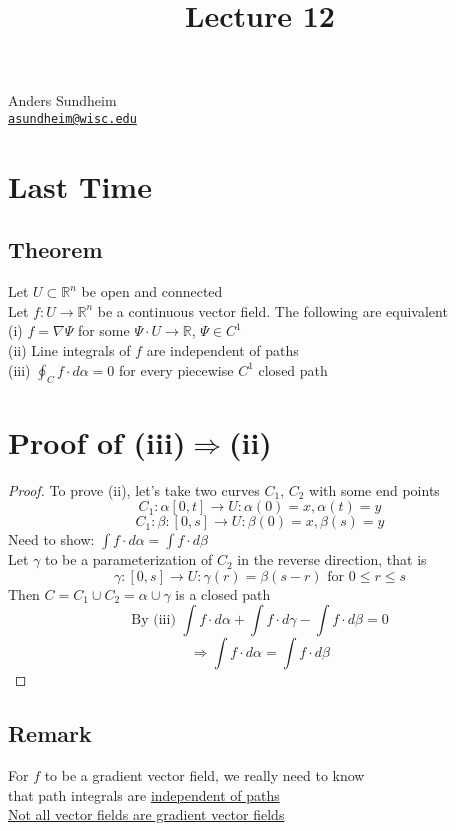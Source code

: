 \documentclass[12pt]{article}
\title{Lecture 12}
\newcommand*\circled[1]{\tikz[baseline=(char.base)]{
    \node[shape=circle,draw,inner sep=2pt] (char) {#1};}}
\newcommand{\BR}{\mathbb R}
\begin{document}
\maketitle
\vspace*{-0.25in}
\begin{center}
	Anders Sundheim \\
	\href{mailto:asundheim@wisc.edu}{{\tt asundheim@wisc.edu}}
\end{center}
\section*{Last Time}
\subsection*{Theorem}
Let $U\subset\BR^n$ be open and connected \\
Let $f: U\rightarrow\BR^n$ be a continuous vector field. The following are equivalent\\
(i) $f=\nabla\Psi$ for some $\Psi\cdot U\rightarrow\BR$, $\Psi\in C^1$ \\
(ii) Line integrals of $f$ are independent of paths \\
(iii) $\oint_C f\cdot d\alpha=0$ for every piecewise $C^1$ closed path \\
\section*{Proof of (iii)$\Rightarrow$(ii)}
\begin{proof}
  To prove (ii), let's take two curves $C_1$, $C_2$ with some end points \\
  \[ C_1: \alpha[0,t]\rightarrow U: \alpha(0)=x, \alpha(t)=y \]
  \[ C_1: \beta:[0,s]\rightarrow U: \beta(0)=x, \beta(s)=y \]
  Need to show: $\int f\cdot d\alpha=\int f\cdot d\beta$ \\
  Let $\gamma$ to be a parameterization of $C_2$ in the reverse direction, that is \\
  \[ \gamma:[0,s]\rightarrow U: \gamma(r)=\beta(s-r)\text{ for } 0\leq r \leq s \]
  Then $C=C_1\cup C_2=\alpha\cup\gamma$ is a closed path \\
  \[ \text{By (iii) } \int f\cdot d\alpha+\int f\cdot d\gamma-\int f\cdot d\beta = 0 \]
  \[ \Rightarrow \int f\cdot d\alpha = \int f \cdot d\beta \]
\end{proof}
\subsection*{Remark}
  \circled{1} For $f$ to be a gradient vector field, we really need to know \\
  that path integrals are \underline{independent of paths} \\
  \circled{2} \underline{Not all vector fields are gradient vector fields} \\
\end{document}
